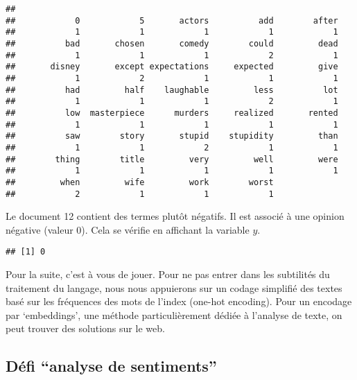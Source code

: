 \documentclass[]{article}
\newenvironment{Shaded}{\begin{snugshade}}{\end{snugshade}}
\newcommand{\DecValTok}[1]{\textcolor[rgb]{0.00,0.00,0.81}{#1}}
\newcommand{\OperatorTok}[1]{\textcolor[rgb]{0.81,0.36,0.00}{\textbf{#1}}}
\newcommand{\NormalTok}[1]{#1}
\begin{document}
\begin{verbatim}
## 
##            0            5       actors          add        after 
##            1            1            1            1            1 
##          bad       chosen       comedy        could         dead 
##            1            1            1            2            1 
##       disney       except expectations     expected         give 
##            1            2            1            1            1 
##          had         half    laughable         less          lot 
##            1            1            1            2            1 
##          low  masterpiece      murders     realized       rented 
##            1            1            1            1            1 
##          saw        story       stupid    stupidity         than 
##            1            1            2            1            1 
##        thing        title         very         well         were 
##            1            1            1            1            1 
##         when         wife         work        worst 
##            2            1            1            1
\end{verbatim}

Le document 12 contient des termes plutôt négatifs. Il est associé à une
opinion négative (valeur 0). Cela se vérifie en affichant la variable
\(y\).

\begin{Shaded}
\end{Shaded}

\begin{verbatim}
## [1] 0
\end{verbatim}

Pour la suite, c'est à vous de jouer. Pour ne pas entrer dans les
subtilités du traitement du langage, nous nous appuierons sur un codage
simplifié des textes basé sur les fréquences des mots de l'index
(one-hot encoding). Pour un encodage par `embeddings', une méthode
particulièrement dédiée à l'analyse de texte, on peut trouver des
solutions sur le web.

\subsection{\texorpdfstring{Défi ``analyse de
sentiments''}{Défi analyse de sentiments}}\label{defi-analyse-de-sentiments}
\end{document}
